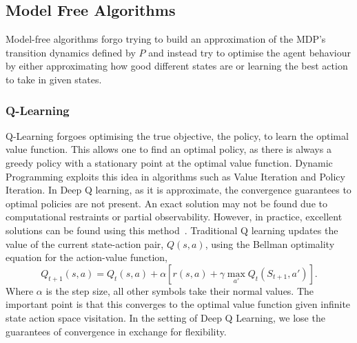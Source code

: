 \subsection{Model Free Algorithms}
Model-free algorithms forgo trying to build an approximation of the MDP's transition dynamics defined by $P$ and instead try to optimise the agent behaviour by either approximating how good different states are or learning the best action to take in given states.
\subsubsection{Q-Learning}
Q-Learning forgoes optimising the true objective, the policy, to learn the optimal value function. This allows one to find an optimal policy, as there is always a greedy policy with a stationary point at the optimal value function. Dynamic Programming exploits this idea in algorithms such as Value Iteration\cite{bellamn1957mdp} and Policy Iteration\cite{howard1960dynamic}. In Deep Q learning, as it is approximate, the convergence guarantees to optimal policies are not present. An exact solution may not be found due to computational restraints or partial observability. However, in practice, excellent solutions can be found using this method~\cite{mnih2013playing}. Traditional Q learning updates the value of the current state-action pair, $Q(s, a)$, using the Bellman optimality equation for the action-value function,
\begin{equation}
	Q_{t+1}(s, a) = Q_t(s,a) + \alpha \left[ r(s, a) + \gamma \max_{a'} Q_t(S_{t+1}, a') \right].
\end{equation}
Where $\alpha$ is the step size, all other symbols take their normal values. The important point is that this converges to the optimal value function given infinite state action space visitation. In the setting of Deep Q Learning, we lose the guarantees of convergence in exchange for flexibility.

